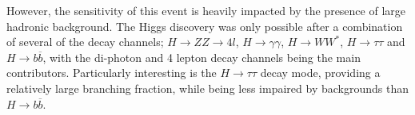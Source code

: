However, the sensitivity of this event is heavily impacted by the presence of large hadronic background. The Higgs discovery was only possible after a combination of several of the decay channels; $H\rightarrow ZZ \rightarrow 4l$, $H\rightarrow \gamma \gamma$, $H\rightarrow WW^*$, $H\rightarrow \tau\tau$ and $H\rightarrow b\overline{b}$, with the di-photon and 4 lepton decay channels being the main contributors. Particularly interesting is the $H\rightarrow \tau\tau$ decay mode, providing a relatively large branching fraction, while being less impaired by backgrounds than $H\rightarrow b\overline{b}$.
